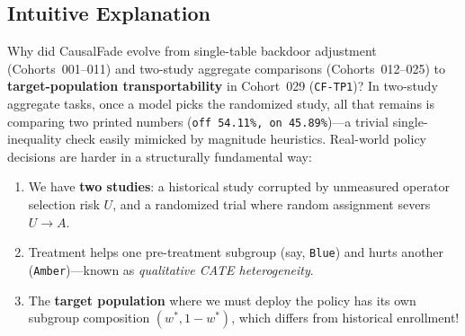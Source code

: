 \subsection{Intuitive Explanation}
Why did CausalFade evolve from single-table backdoor adjustment (Cohorts~001--011) and two-study aggregate comparisons (Cohorts~012--025) to \textbf{target-population transportability} in Cohort~029 (\texttt{CF-TP1})? In two-study aggregate tasks, once a model picks the randomized study, all that remains is comparing two printed numbers (\texttt{off 54.11\%, on 45.89\%})---a trivial single-inequality check easily mimicked by magnitude heuristics. Real-world policy decisions are harder in a structurally fundamental way:
\begin{enumerate}
  \item We have \textbf{two studies}: a historical study corrupted by unmeasured operator selection risk $U$, and a randomized trial where random assignment severs $U \to A$.
  \item Treatment helps one pre-treatment subgroup (say, \texttt{Blue}) and hurts another (\texttt{Amber})---known as \emph{qualitative CATE heterogeneity}.
  \item The \textbf{target population} where we must deploy the policy has its own subgroup composition $(w^*, 1-w^*)$, which differs from historical enrollment!
\end{enumerate}

